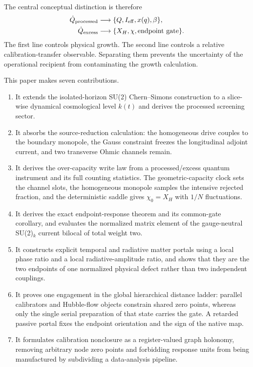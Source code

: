 \documentclass[aps,prd,twocolumn,10pt,superscriptaddress,nofootinbib]{revtex4-2}
\begin{document}
The central conceptual distinction is therefore
\begin{align}
\dot Q_{\rm processed}
&\longrightarrow \{Q,I_{\rm eff},x(q),\beta\},\notag\\
\dot Q_{\rm excess}
&\longrightarrow \{X_H,\chi,\text{endpoint gate}\}.
\label{eq:two_branch_logic}
\end{align}
The first line controls physical growth.  The second line controls a
relative calibration-transfer observable.  Separating them prevents the
uncertainty of the operational recipient from contaminating the growth
calculation.

This paper makes seven contributions.
\begin{enumerate}
\item It extends the isolated-horizon SU(2) Chern--Simons construction to a
slice-wise dynamical cosmological level $k(t)$ and derives the processed
screening sector.
\item It absorbs the source-reduction calculation: the homogeneous drive
couples to the boundary monopole, the Gauss constraint freezes the
longitudinal adjoint current, and two transverse Ohmic channels remain.
\item It derives the over-capacity write law from a processed/excess quantum
instrument and its full counting statistics.  The geometric-capacity clock
sets the channel slots, the homogeneous monopole samples the intensive
rejected fraction, and the deterministic saddle gives $\chi_0=X_H$ with
$1/N$ fluctuations.
\item It derives the exact endpoint-response theorem and its common-gate
corollary, and evaluates the normalized matrix element of the gauge-neutral
SU(2)$_k$ current bilocal of total weight two.
\item It constructs explicit temporal and radiative matter portals using a
local phase ratio and a local radiative-amplitude ratio, and shows that they
are the two endpoints of one normalized physical defect rather than two
independent couplings.
\item It proves one engagement in the global hierarchical distance ladder:
parallel calibrators and Hubble-flow objects constrain shared zero points,
whereas only the single serial preparation of that state carries the gate.
A retarded passive portal fixes the endpoint orientation and the sign of the
native map.
\item It formulates calibration nonclosure as a register-valued graph
holonomy, removing arbitrary node zero points and forbidding response units
from being manufactured by subdividing a data-analysis pipeline.
\end{enumerate}
\end{document}
